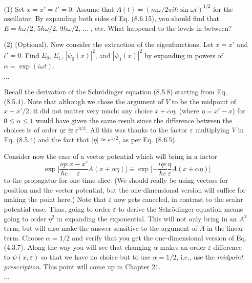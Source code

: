 \documentclass[../principles-of-quantum-mechanics.tex]{subfiles}
\begin{document}
\begin{questions}
		(1) Set $x = x' = t' = 0$. Assume that $A(t) = (m\omega/2\pi i \hbar \sin \omega t)^{1/2}$ for the oscillator. By expanding both sides of Eq. (8.6.15), you should find that $E = \hbar\omega/2$, $5\hbar\omega/2$, $9\hbar\omega/2$, $\ldots$ , etc. What happened to the levels in between?
		
		(2) (Optional). Now consider the extraction of the eigenfunctions. Let $x = x'$ and $t' = 0$. Find $E_0$, $E_1$, $|\psi_0(x)|^2$, and $|\psi_1(x)|^2$ by expanding in powers of $\alpha = \exp(i\omega t)$.
		\begin{solution}
			$\cdots$
		\end{solution}
		
		\question Recall the derivation of the Schr\"odinger equation (8.5.8) starting from Eq. (8.5.4). Note that although we chose the argument of $V$ to be the midpoint of $x + x'/2$, it did not matter very much: any choice $x + \alpha\eta$, (where $\eta = x' - x$) for $0 \leq \alpha \leq 1$ would have given the same result since the difference between the choices is of order $\eta\varepsilon \approxeq \varepsilon^{3/2}$. All this was thanks to the factor $\varepsilon$ multiplying $V$ in Eq. (8.5.4) and the fact that $|\eta| \approxeq \varepsilon^{1/2}$, as per Eq. (8.6.5).
		
		Consider now the case of a vector potential which will bring in a factor
		$$\exp\Big[\frac{iq\varepsilon}{\hbar c}\frac{x - x'}{\varepsilon}A(x + \alpha\eta)\Big] \equiv \exp\Big[{-\frac{iq\varepsilon}{\hbar c}}\frac{\eta}{\varepsilon}A(x + \alpha\eta)\Big]$$
		to the propagator for one time slice. (We should really be using vectors for position and the vector potential, but the one-dimensional version will suffice for making the point here.) Note that $\varepsilon$ now gets canceled, in contrast to the scalar potential case. Thus, going to order $\varepsilon$ to derive the Schr\"odinger equation means going to order $\eta^2$ in expanding the exponential. This will not only bring in an $A^2$ term, but will also make the answer sensitive to the argument of $A$ in the linear term. Choose $\alpha = 1/2$ and verify that you get the one-dimensional version of Eq. (4.3.7). Along the way you will see that changing $\alpha$ makes an order $\varepsilon$ difference to $\psi(x, \varepsilon)$ so that we have no choice but to use $\alpha = 1/2$, i.e., use the \textit{midpoint prescription}. This point will come up in Chapter 21.
		\begin{solution}
			$\cdots$
		\end{solution}
		
	\end{questions}
\end{document}
